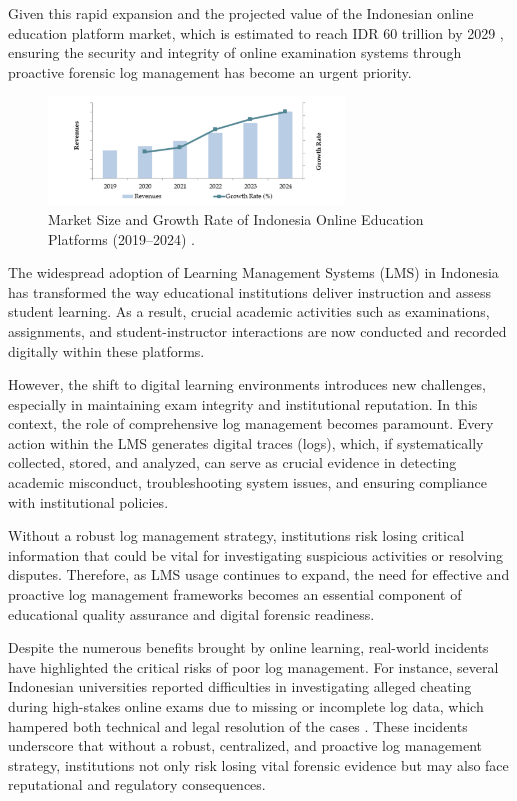 Given this rapid expansion and the projected value of the Indonesian online education platform market, which is estimated to reach IDR 60 trillion by 2029 \cite{tracedata2024}, ensuring the security and integrity of online examination systems through proactive forensic log management has become an urgent priority.

\begin{figure}[htbp]
	\centering
	\includegraphics[width=0.7\textwidth]{figure/indonesia-online-platform-market.png}
	\caption{Market Size and Growth Rate of Indonesia Online Education Platforms (2019--2024) \cite{tracedata2024}.}
	\label{fig:market-growth}
\end{figure}

The widespread adoption of Learning Management Systems (LMS) in Indonesia has transformed the way educational institutions deliver instruction and assess student learning. As a result, crucial academic activities such as examinations, assignments, and student-instructor interactions are now conducted and recorded digitally within these platforms.

However, the shift to digital learning environments introduces new challenges, especially in maintaining exam integrity and institutional reputation. In this context, the role of comprehensive log management becomes paramount. Every action within the LMS generates digital traces (logs), which, if systematically collected, stored, and analyzed, can serve as crucial evidence in detecting academic misconduct, troubleshooting system issues, and ensuring compliance with institutional policies.

Without a robust log management strategy, institutions risk losing critical information that could be vital for investigating suspicious activities or resolving disputes. Therefore, as LMS usage continues to expand, the need for effective and proactive log management frameworks becomes an essential component of educational quality assurance and digital forensic readiness.

Despite the numerous benefits brought by online learning, real-world incidents have highlighted the critical risks of poor log management. For instance, several Indonesian universities reported difficulties in investigating alleged cheating during high-stakes online exams due to missing or incomplete log data, which hampered both technical and legal resolution of the cases \cite{rosmansyah2019attackdefensetreeonaeexamsystem, lintang2024log}. These incidents underscore that without a robust, centralized, and proactive log management strategy, institutions not only risk losing vital forensic evidence but may also face reputational and regulatory consequences.

